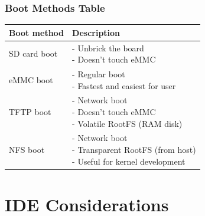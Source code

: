 \begin{frame}
  \frametitle{Boot Methods Table}
      \begin{table}
        \begin{tabular}{@{} ll @{}}
          \toprule
          Boot method & Description\\
          \midrule
          SD card boot & \makecell[l]{
            - Unbrick the board               \\
            - Doesn't touch eMMC
          }                                   \\
          \hline
          eMMC boot & \makecell[l]{
            - Regular boot                    \\
            - Fastest and easiest for user
          }                                   \\
          \hline
          TFTP boot & \makecell[l]{
            - Network boot                    \\
            - Doesn't touch eMMC              \\
            - Volatile RootFS (RAM disk)
          }                                   \\
          \hline
          NFS boot & \makecell[l]{
            - Network boot                    \\
            - Transparent RootFS (from host)  \\
            - Useful for kernel development
          }                                   \\
          \bottomrule
        \end{tabular}
        \vspace*{-10mm} %
      \end{table}
\end{frame}

\section{IDE Considerations}

